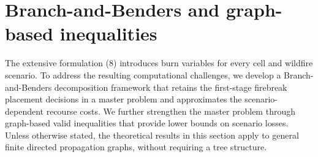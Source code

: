 \documentclass[a4paper,fleqn]{cas-sc}
\begin{document}




\section{Branch-and-Benders and graph-based inequalities}
\label{sec:branch_benders}

The extensive formulation (8) introduces burn variables for every cell and wildfire scenario. To address the resulting computational challenges, we develop a Branch-and-Benders decomposition framework that retains the first-stage firebreak placement decisions in a master problem and approximates the scenario-dependent recourse costs. We further strengthen the master problem through graph-based valid inequalities that provide lower bounds on scenario losses. Unless otherwise stated, the theoretical results in this section apply to general finite directed propagation graphs, without requiring a tree structure.
\end{document}
